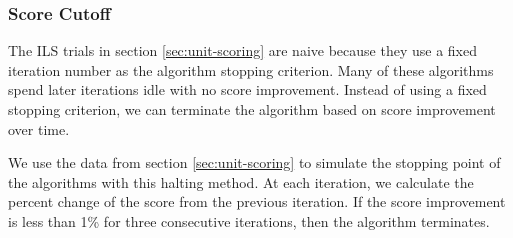 \documentclass[honors]{union-cs-thesis}
\newcommand{\td}{\todo[inline]}
\begin{document}
%
%

\subsubsection{Score Cutoff}
The ILS trials in section \ref{sec:unit-scoring} are naive because they use a fixed iteration number as the algorithm stopping criterion. Many of these algorithms spend later iterations idle with no score improvement. Instead of using a fixed stopping criterion, we can terminate the algorithm based on score improvement over time. 

We use the data from section \ref{sec:unit-scoring} to simulate the stopping point of the algorithms with this halting method. At each iteration, we calculate the percent change of the score from the previous iteration. If the score improvement is less than 1\% for three consecutive iterations, then the algorithm terminates.    
\end{document}
